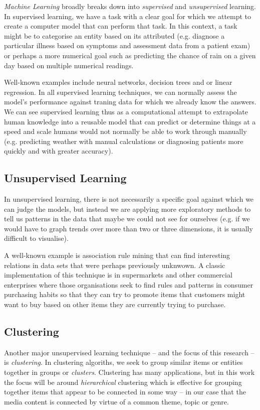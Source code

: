 \emph{Machine Learning} broadly breaks down into \emph{supervised}
and \emph{unsupervised} learning. In supervised learning, we have
a task with a clear goal for which we attempt to create a computer
model that can perform that task. In this context, a task might be
to categorise an entity based on its attributed (e.g. diagnose
a particular illness based on symptoms and assessment data from a
patient exam) or perhaps a more numerical goal such as predicting
the chance of rain on a given day based on multiple numerical
readings.

Well-known examples include neural networks, decision trees and or
linear regression. In all supervised learning techniques, we can
normally assess the model's performance against traning data for
which we already know the answers. We can see supervised learning
thus as a computational attempt to extrapolate human knowledge into
a reusable model that can predict or determine things at a speed
and scale humans would not normally be able to work through manually
(e.g. predicting weather with manual calculations or diagnosing
patients more quickly and with greater accuracy).

\subsection{Unsupervised Learning}

In unsupervised learning, there is not necessarily a specific goal
against which we can judge the models, but instead we are applying
more exploratory methods to tell us patterns in the data that maybe
we could not see for ourselves (e.g. if we would have to graph trends
over more than two or three dimensions, it is usually difficult to
visualise).

A well-known example is association rule mining that can find
interesting relations in data sets that were perhaps previously
unknwown. A classic implementation of this technique is in
supermarkets and other commercial enterprises where those
organisations seek to find rules and patterns in consumer purchasing
habits so that they can try to promote items that customers might
want to buy based on other items they are currently trying to
purchase.

\subsection{Clustering}

Another major unsupervised learning technique -- and the focus of
this research -- is \emph{clustering}. In clustering algoriths, we
seek to group similar items or entities together in groups or
\emph{clusters}. Clustering has many applications, but in this
work the focus will be around \emph{hierarchical} clustering which
is effective for grouping together items that appear to be
connected in some way -- in our case that the media content is
connected by virtue of a common theme, topic or genre.

